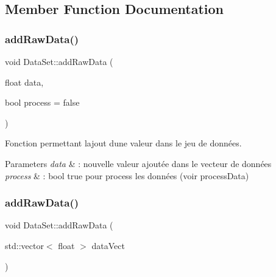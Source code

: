 \subsection{Member Function Documentation}
\mbox{\label{classDataSet_ac2453c8cd424ed33b941363a45c009f8}} 
\subsubsection{\texorpdfstring{add\+Raw\+Data()}{addRawData()}\hspace{0.1cm}{\footnotesize\ttfamily [1/2]}}
{\footnotesize\ttfamily void Data\+Set\+::add\+Raw\+Data (\begin{DoxyParamCaption}\item[{float}]{data,  }\item[{bool}]{process = {\ttfamily false} }\end{DoxyParamCaption})}



Fonction permettant l\textquotesingle{}ajout d\textquotesingle{}une valeur dans le jeu de données. 


\begin{DoxyParams}{Parameters}
{\em data} & \+: nouvelle valeur ajoutée dans le vecteur de données \\
\hline
{\em process} & \+: bool true pour process les données (voir process\+Data) \\
\hline
\end{DoxyParams}
\mbox{\label{classDataSet_a71cfe353100966c9bdfb1f6880075691}} 
\subsubsection{\texorpdfstring{add\+Raw\+Data()}{addRawData()}\hspace{0.1cm}{\footnotesize\ttfamily [2/2]}}
{\footnotesize\ttfamily void Data\+Set\+::add\+Raw\+Data (\begin{DoxyParamCaption}\item[{std\+::vector$<$ float $>$}]{data\+Vect }\end{DoxyParamCaption})}



